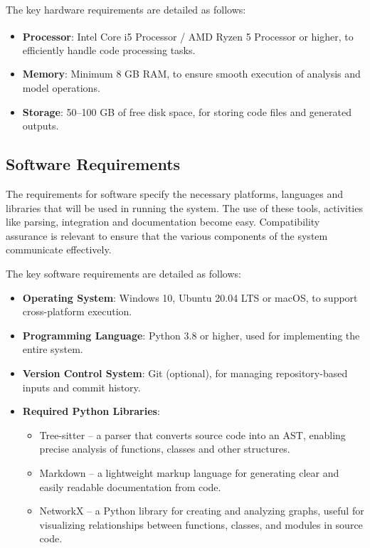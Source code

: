 The key hardware requirements are detailed as follows:


\begin{itemize}
\item \textbf{Processor}: Intel\textsuperscript{\textregistered} Core\textsuperscript{\texttrademark} i5 Processor / AMD Ryzen\textsuperscript{\texttrademark} 5 Processor or higher, to efficiently handle code processing tasks.

\item \textbf{Memory}: Minimum 8 GB RAM, to ensure smooth execution of analysis and model operations.

\item \textbf{Storage}: 50–100 GB of free disk space, for storing code files and generated outputs.
\end{itemize}

\subsection{Software Requirements}
\hspace{0.5cm}
The requirements for software specify the necessary platforms, languages and libraries that will be used in running the system. The use of these tools, activities like parsing, integration and documentation become easy. Compatibility assurance is relevant to ensure that the various components of the system communicate effectively. 


The key software requirements are detailed as follows:
\begin{itemize}
    \item \textbf{Operating System}: Windows 10, Ubuntu 20.04 LTS or macOS, to support cross-platform execution.
    
    \item \textbf{Programming Language}: Python 3.8 or higher, used for implementing the entire system.
    
    \item \textbf{Version Control System}: Git (optional), for managing repository-based inputs and commit history.
    
    \item \textbf{Required Python Libraries}:
   \begin{itemize}
\item Tree-sitter – a parser that converts source code into an AST, enabling precise analysis of functions, classes and other structures.
\item Markdown – a lightweight markup language for generating clear and easily readable documentation from code.
\item NetworkX – a Python library for creating and analyzing graphs, useful for visualizing relationships between functions, classes, and modules in source code.
\end{itemize}
\end{itemize}

